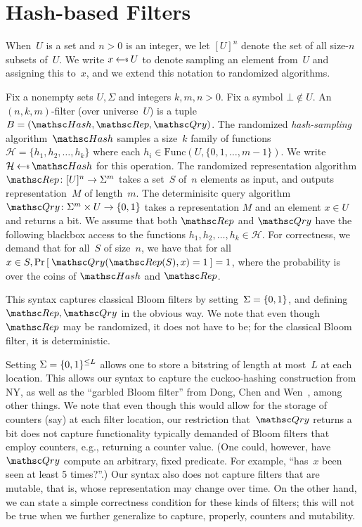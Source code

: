 \section{Hash-based Filters}
When~$U$ is a set and $n>0$ is an integer, we let $[U]^n$ denote the set of all size-$n$ subsets of~$U$.  
We write $x \getsr U$ to denote sampling an element from~$U$ and assigning this to~$x$, and we extend this notation to randomized algorithms.

Fix a nonempty sets $U,\Sigma$ and integers $k,m,n>0$.  Fix a symbol $\bot \not\in U$.  An $(n,k,m)$-filter (over universe~$U$) is a tuple  $B=(\Hash,\Rep,\Qry)$.   
%
The randomized \emph{hash-sampling} algorithm~$\Hash$ samples a size~$k$ family of functions~$\mathcal{H}=\{h_1,h_2,\ldots,h_k\}$ where each $h_i \in  \mathrm{Func}(U,\{0,1,\ldots,m-1\})$.  We write $\mathcal{H} \getsr \Hash$ for this operation.
%
The randomized representation algorithm $\Rep\colon [U]^n \rightarrow \Sigma^m$ takes a set~$S$ of~$n$ elements as input, and outputs representation~$M$ of length~$m$.
%
The determinisitc query algorithm $\Qry\colon \Sigma^m \times U \rightarrow \bits$ takes a representation $M$ and an element $x \in U$ and returns a bit.  
%
We assume that both $\Rep$ and $\Qry$ have the following blackbox access to the functions $h_1,h_2,\ldots,h_k \in \mathcal{H}$.
%
For correctness, we demand that for all~$S$ of size~$n$, we have that for all $x \in S, \Prob{\Qry(\Rep(S),x)=1}=1$, where the probability is over the coins of $\Hash$ and $\Rep$.  


This syntax captures classical Bloom filters by setting~$\Sigma=\{0,1\}$,  and defining $\Rep,\Qry$ in the obvious way. We note that even though $\Rep$ may be randomized, it does not have to be; for the classical Bloom filter, it is deterministic.

Setting $\Sigma=\{0,1\}^{\leq L}$ allows one to store a bitstring of length at most~$L$ at each location.  This allows our syntax to capture the cuckoo-hashing construction from NY, as well as the ``garbled Bloom filter'' from Dong, Chen and Wen~\cite{xxx}, among other things. We note that even though this would allow for the storage of counters (say) at each filter location, our restriction that~$\Qry$ returns a bit does not capture functionality typically demanded of Bloom filters that employ counters, e.g., returning a counter value. (One could, however, have $\Qry$ compute an arbitrary, fixed predicate.  For example, ``has~$x$ been seen at least 5 times?''.)  
Our syntax also does not capture filters that are mutable, that is, whose representation may change over time. 
On the other hand, we can state a simple correctness condition for these kinds of filters; this will not be true when we further generalize to capture, properly, counters and mutability.

